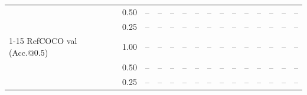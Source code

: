 \begin{table}[t]
{\begin{tabular}{l c | c c c c | c c c c | c c | c c c}
 & 0.50 & -- & -- & -- & -- & -- & -- & -- & -- & -- & -- & -- & -- & -- \\
 & 0.25 & -- & -- & -- & -- & -- & -- & -- & -- & -- & -- & -- & -- & -- \\
\cmidrule(lr){1-15}
RefCOCO val (Acc.@0.5) & 1.00 & -- & -- & -- & -- & -- & -- & -- & -- & -- & -- & -- & -- & -- \\
 & 0.50 & -- & -- & -- & -- & -- & -- & -- & -- & -- & -- & -- & -- & -- \\
 & 0.25 & -- & -- & -- & -- & -- & -- & -- & -- & -- & -- & -- & -- & -- \\
\bottomrule
\end{tabular}}
\end{table}
